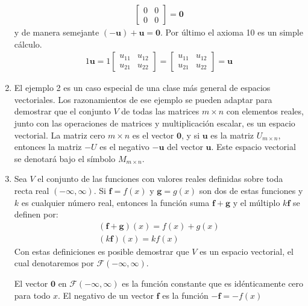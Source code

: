\documentclass[a4paper,12pt]{article}
\begin{document}
\begin{enumerate}[\textsc{Ejemplo} 1:, wide=\parindent]
\begin{align*}
\begin{bmatrix}
        0 & 0 \\
        0 & 0
      \end{bmatrix}
      = \mathbf{0}
    \end{align*}
    y de manera semejante $(-\mathbf{u})+\mathbf{u}=\mathbf{0}$. Por último el
    axioma 10 es un simple cálculo.
    \begin{align*}
      1\mathbf{u}=1
      \begin{bmatrix}
        u_{11} & u_{12} \\
        u_{21} & u_{22}
      \end{bmatrix}
      =
      \begin{bmatrix}
        u_{11} & u_{12} \\
        u_{21} & u_{22}
      \end{bmatrix}
      =\mathbf{u}
    \end{align*}

  \item El ejemplo 2 es un caso especial de una clase más general de espacios
    vectoriales. Los razonamientos de ese ejemplo se pueden adaptar para
    demostrar que el conjunto $V$ de todas las matrices $m\times n$ con
    elementos reales, junto con las operaciones de matrices y multiplicación
    escalar, es un espacio vectorial. La matriz cero $m\times n$ es el vector
    $\mathbf{0}$, y si $\mathbf{u}$ es la matriz $U_{m\times n}$, entonces la
    matriz $-U$ es el negativo $-\mathbf{u}$ del vector $\mathbf{u}$. Este
    espacio vectorial se denotará bajo el símbolo $M_{m\times n}$.
  \item Sea $V$ el conjunto de las funciones con valores reales definidas
    sobre toda recta real $(-\infty,\infty)$. Si $\mathbf{f}=f(x)$ y
    $\mathbf{g}=g(x)$ son dos de estas funciones y $k$ es cualquier número
    real, entonces la función suma $\mathbf{f}+\mathbf{g}$ y el múltiplo
    $k\mathbf{f}$ se definen por:
    \begin{align*}
      (\mathbf{f}+\mathbf{g})(x)=f(x)+g(x) \\
      (k\mathbf{f})(x)=kf(x)
    \end{align*}
    Con estas definiciones es posible demostrar que $V$ es un espacio
    vectorial, el cual denotaremos por $\mathcal{F}(-\infty,\infty)$.

    El vector $\mathbf{0}$ en $\mathcal{F}(-\infty,\infty)$ es la función
    constante que es idénticamente cero para todo $x$. El negativo de un
    vector $\mathbf{f}$ es la función $-\mathbf{f}=-f(x)$
\end{enumerate}
\end{document}
